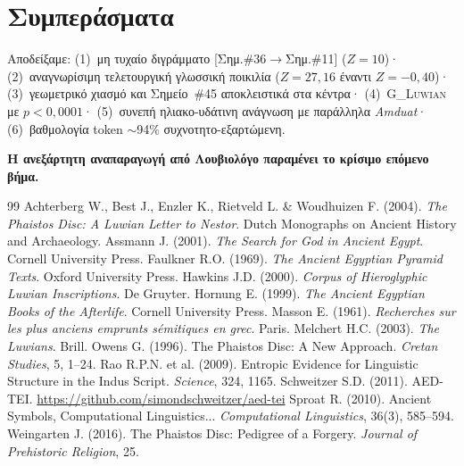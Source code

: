 \documentclass[12pt,a4paper]{article}
\begin{document}
\section{Συμπεράσματα}

Αποδείξαμε: (1)~μη τυχαίο διγράμματο [Σημ.\#36$\to$Σημ.\#11] ($Z=10$)· (2)~αναγνωρίσιμη τελετουργική γλωσσική ποικιλία ($Z=27{,}16$ έναντι $Z=-0{,}40$)· (3)~γεωμετρικό χιασμό και Σημείο~\#45 αποκλειστικά στα κέντρα· (4)~\textsc{G\_Luwian} με $p<0{,}0001$· (5)~συνεπή ηλιακο-υδάτινη ανάγνωση με παράλληλα \textit{Amduat}· (6)~βαθμολογία token $\sim$94\% συχνοτητο-εξαρτώμενη.

\textbf{Η ανεξάρτητη αναπαραγωγή από Λουβιολόγο παραμένει το κρίσιμο επόμενο βήμα.}

\begin{thebibliography}{99}
 Achterberg W., Best J., Enzler K., Rietveld L. \& Woudhuizen F. (2004). \textit{The Phaistos Disc: A Luwian Letter to Nestor}. Dutch Monographs on Ancient History and Archaeology.
 Assmann J. (2001). \textit{The Search for God in Ancient Egypt}. Cornell University Press.
 Faulkner R.O. (1969). \textit{The Ancient Egyptian Pyramid Texts}. Oxford University Press.
 Hawkins J.D. (2000). \textit{Corpus of Hieroglyphic Luwian Inscriptions}. De Gruyter.
 Hornung E. (1999). \textit{The Ancient Egyptian Books of the Afterlife}. Cornell University Press.
 Masson E. (1961). \textit{Recherches sur les plus anciens emprunts sémitiques en grec}. Paris.
 Melchert H.C. (2003). \textit{The Luwians}. Brill.
 Owens G. (1996). The Phaistos Disc: A New Approach. \textit{Cretan Studies}, 5, 1--24.
 Rao R.P.N. et al. (2009). Entropic Evidence for Linguistic Structure in the Indus Script. \textit{Science}, 324, 1165.
 Schweitzer S.D. (2011). AED-TEI. \url{https://github.com/simondschweitzer/aed-tei}
 Sproat R. (2010). Ancient Symbols, Computational Linguistics... \textit{Computational Linguistics}, 36(3), 585--594.
 Weingarten J. (2016). The Phaistos Disc: Pedigree of a Forgery. \textit{Journal of Prehistoric Religion}, 25.
\end{thebibliography}
\end{document}
